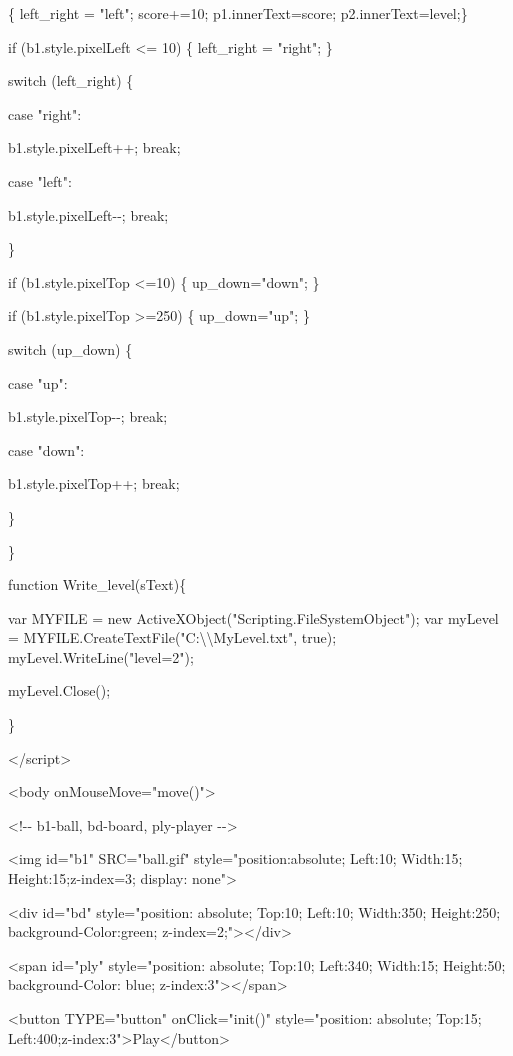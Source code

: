 \documentclass[
]{article}
\begin{document}
\{ left\_right = "left"; score+=10; p1.innerText=score;
p2.innerText=level;\}

if (b1.style.pixelLeft \textless= 10) \{ left\_right = "right"; \}

switch (left\_right) \{

case "right":

b1.style.pixelLeft++; break;

case "left":

b1.style.pixelLeft-\/-; break;

\}

if (b1.style.pixelTop \textless=10) \{ up\_down="down"; \}

if (b1.style.pixelTop \textgreater=250) \{ up\_down="up"; \}

switch (up\_down) \{

case "up":

b1.style.pixelTop-\/-; break;

case "down":

b1.style.pixelTop++; break;

\}

\}

function Write\_level(sText)\{

var MYFILE = new ActiveXObject("Scripting.FileSystemObject"); var
myLevel =
MYFILE.CreateTextFile("C:\textbackslash\textbackslash MyLevel.txt",
true); myLevel.WriteLine("level=2");

myLevel.Close();

\}

\textless/script\textgreater{}

\textless body onMouseMove="move()"\textgreater{}

\textless!-\/- b1-ball, bd-board, ply-player -\/-\textgreater{}

\textless img id="b1" SRC="ball.gif" style="position:absolute; Left:10;
Width:15; Height:15;z-index=3; display: none"\textgreater{}

\textless div id="bd" style="position: absolute; Top:10; Left:10;
Width:350; Height:250; background-Color:green;
z-index=2;"\textgreater\textless/div\textgreater{}

\textless span id="ply" style="position: absolute; Top:10; Left:340;
Width:15; Height:50; background-Color: blue;
z-index:3"\textgreater\textless/span\textgreater{}

\textless button TYPE="button" onClick="init()" style="position:
absolute; Top:15;
Left:400;z-index:3"\textgreater Play\textless/button\textgreater{}
\end{document}
